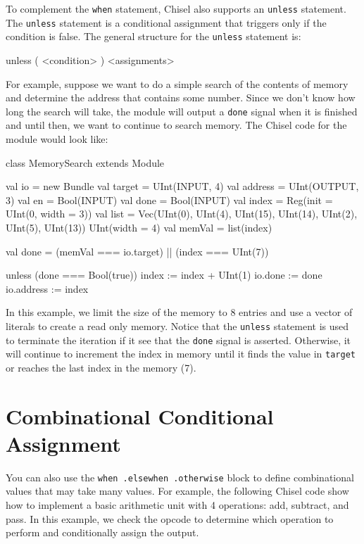 To complement the \verb+when+ statement, Chisel also supports an \verb+unless+ statement. The \verb+unless+ statement is a conditional assignment that triggers only if the condition is false. The general structure for the \verb+unless+ statement is:

\begin{scala}
unless ( <condition> ) { <assignments> }
\end{scala}

For example, suppose we want to do a simple search of the contents of memory and determine the address that contains some number. Since we don't know how long the search will take, the module will output a \verb+done+ signal when it is finished and until then, we want to continue to search memory. The Chisel code for the module would look like:

\begin{scala}
class MemorySearch extends Module {
  val io = new Bundle {
    val target  = UInt(INPUT,  4)
    val address = UInt(OUTPUT, 3)
    val en      = Bool(INPUT)
    val done    = Bool(INPUT)
  }
  val index  = Reg(init = UInt(0, width = 3))
  val list   = Vec(UInt(0), UInt(4), UInt(15), UInt(14), UInt(2), UInt(5), UInt(13)){ UInt(width = 4) }
  val memVal = list(index)

  val done = (memVal === io.target) || (index === UInt(7))

  unless (done === Bool(true)) {
    index := index + UInt(1)
  }
  io.done    := done
  io.address := index
}
\end{scala}

In this example, we limit the size of the memory to 8 entries and use a vector of literals to create a read only memory. Notice that the \verb+unless+ statement is used to terminate the iteration if it see that the \verb+done+ signal is asserted. Otherwise, it will continue to increment the index in memory until it finds the value in \verb+target+ or reaches the last index in the memory (7).

\section{Combinational Conditional Assignment}

You can also use the \verb+when .elsewhen .otherwise+ block to define combinational values that may take many values. For example, the following Chisel code show how to implement a basic arithmetic unit with 4 operations: add, subtract, and pass. In this example, we check the opcode to determine which operation to perform and conditionally assign the output.

